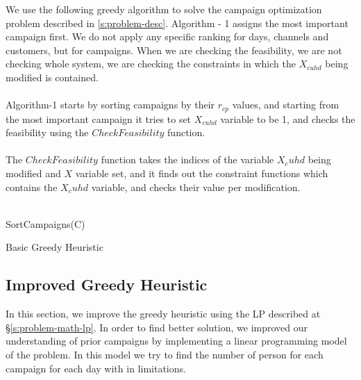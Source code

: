 \documentclass[11pt]{article}
\begin{document}
We use the following greedy algorithm to solve the campaign optimization problem described in \ref{s:problem-desc}. Algorithm - 1 assigns the most important campaign first. We do not apply any specific ranking for days, channels and customers, but for campaigns. When we are checking the feasibility, we are not checking whole system, we are checking the constraints in which the $X_{{c}{u}{h}{d}}$ being modified is contained.
\\
\\
Algorithm-1 starts by sorting campaigns by their $r_{cp}$ values, and starting from the most important campaign it tries to set $X_{cuhd}$ variable to be 1, and checks the feasibility using the $CheckFeasibility$ function.
\\
\\
The $CheckFeasibility$ function takes the indices of the variable $X_cuhd$ being modified and $X$ variable set, and it finds out the constraint functions which contains the $X_cuhd$ variable, and checks their value per modification.
\\
\\
\begin{algorithm}[H]
\DontPrintSemicolon
{}

  \;
SortCampaigns(C) 
\;
\caption{Basic Greedy Heuristic}
\label{algo:greedy_impl1}
\end{algorithm}

\subsection{Improved Greedy Heuristic} \label{s:greedy_heuristic_improved}
In this section, we improve the greedy heuristic using the LP described at \S \ref{s:problem-math-lp}. In order to find better solution, we improved our understanding of prior campaigns by implementing a linear programming model of the problem. In this model we try to find the number of person for each campaign for each day with in limitations.
\end{document}
